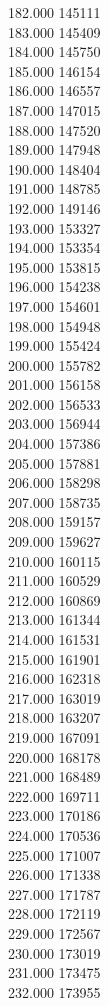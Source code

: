 { 182.000	145111 \\
 183.000	145409 \\
 184.000	145750 \\
 185.000	146154 \\
 186.000	146557 \\
 187.000	147015 \\
 188.000	147520 \\
 189.000	147948 \\
 190.000	148404 \\
 191.000	148785 \\
 192.000	149146 \\
 193.000	153327 \\
 194.000	153354 \\
 195.000	153815 \\
 196.000	154238 \\
 197.000	154601 \\
 198.000	154948 \\
 199.000	155424 \\
 200.000	155782 \\
 201.000	156158 \\
 202.000	156533 \\
 203.000	156944 \\
 204.000	157386 \\
 205.000	157881 \\
 206.000	158298 \\
 207.000	158735 \\
 208.000	159157 \\
 209.000	159627 \\
 210.000	160115 \\
 211.000	160529 \\
 212.000	160869 \\
 213.000	161344 \\
 214.000	161531 \\
 215.000	161901 \\
 216.000	162318 \\
 217.000	163019 \\
 218.000	163207 \\
 219.000	167091 \\
 220.000	168178 \\
 221.000	168489 \\
 222.000	169711 \\
 223.000	170186 \\
 224.000	170536 \\
 225.000	171007 \\
 226.000	171338 \\
 227.000	171787 \\
 228.000	172119 \\
 229.000	172567 \\
 230.000	173019 \\
 231.000	173475 \\
 232.000	173955 \\
}
